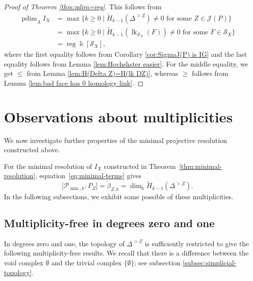 \documentclass[a4paper,leqno]{amsart}
\begin{document}
\begin{proof}[Proof of Theorem \ref{thm:pdim=reg}]
This follows from
\begin{align*}
\operatorname{pdim}_A I_X
&=\max\{k\geq0\mid\widetilde H_{k-1}(\Delta^{>\underline{Z}})\neq0
             \text{ for some }Z\in\mathcal J(P)\}\\
&=\max\{k\geq0\mid\widetilde H_{k-1}(\operatorname{lk}_{\mathcal S_X}(F))\neq0
             \text{ for some }F\in\mathcal S_X\}\\
&=\operatorname{reg}\Bbbk[\mathcal S_X],
\end{align*}
where the first equality follows from Corollary \ref{cor:SigmaJ(P) is IG} and the last equality follows from Lemma \ref{lem:Hochshster easier}. For the middle equality, we get $\le$ from Lemma \ref{lem:H(Delta Z)=H(lk DZ)}, whereas $\ge$ follows from Lemma \ref{lem:bad face has 0 homology link}.
\end{proof}


\section{Observations about multiplicities}
\label{sec:low-degree-multiplicity}

We now investigate further properties of the minimal projective resolution constructed above.

For the minimal resolution of $I_X$ constructed in Theorem~\ref{thm:minimal-resolution}, equation~\eqref{eq:minimal-terms} gives
\begin{equation*}
 \bigl[\mathcal P_{\min,k}:P_Z\bigr]
 =\widetilde\beta_{Z,k}
 =\dim_{\Bbbk}\widetilde H_{k-1}(\Delta^{>\underline{Z}}).
\end{equation*}
In the following subsections, we exhibit some possible of these multiplicities.

\subsection{Multiplicity-free in degrees zero and one}
\label{subsec:multi-free deg 0 1}
In degrees zero and one, the topology of $\Delta^{>\underline{Z}}$ is sufficiently restricted to give the following multiplicity-free results.  We recall that there is a difference between the void complex $\emptyset$ and the trivial complex $\{\emptyset\}$; see subsection \ref{subsec:simplicial-topology}.
\end{document}
